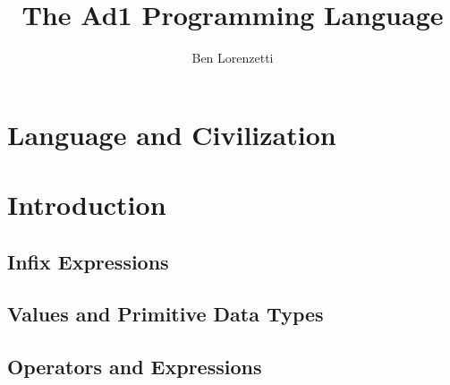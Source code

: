 \documentclass[11pt]{book}
\begin{document}
\title{The Ad1 Programming Language}
\author{Ben Lorenzetti}
\maketitle

\chapter[Preface]{Language and Civilization}

\chapter{Introduction}
\section{Infix Expressions}
\section{Values and Primitive Data Types}
\section{Operators and Expressions}
\end{document}
